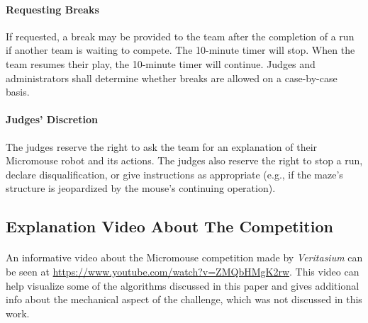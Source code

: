 \documentclass[12pt]{article}
\begin{document}
\paragraph{Requesting Breaks}
If requested, a break may be provided to the team after the completion of a run if
another team is waiting to compete. The 10-minute timer will stop. When the team
resumes their play, the 10-minute timer will continue. Judges and administrators shall
determine whether breaks are allowed on a case-by-case basis.
\paragraph{Judges’ Discretion}
The judges reserve the right to ask the team for an explanation of their \gls{Micromouse}
robot and its actions. The judges also reserve the right to stop a run, declare
disqualification, or give instructions as appropriate (e.g., if the \gls{maze}'s structure is jeopardized by the mouse's continuing operation).

\subsection{Explanation Video About The Competition} \label{explanation video}
\paragraph{}
An informative video about the \gls{Micromouse} competition made by \textit{Veritasium} can be seen at \url{https://www.youtube.com/watch?v=ZMQbHMgK2rw}.
This video can help visualize some of the algorithms discussed in this paper and gives additional info about the mechanical aspect of the challenge, which was not discussed in this work.

\newpage



\end{document}
